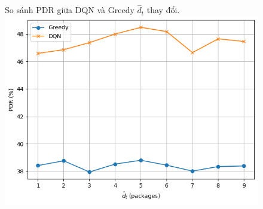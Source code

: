 \documentclass{uetgraduation}
\begin{document}
\begin{figure}{So sánh PDR giữa DQN và Greedy $\hat{d}_t$ thay đổi.}
    \centering
    \includegraphics[scale=0.8]{dt_pdr}
    \label{fig:dt_pdr}
\end{figure}
\end{document}
